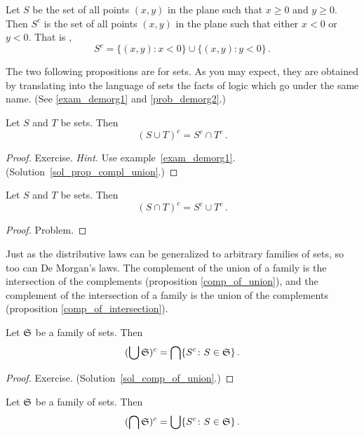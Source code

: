 \begin{exam} Let $S$ be the set of all points $(x,y)$ in the plane such that $x \ge 0$ and
$y \ge 0$.  Then $S^c$ is the set of all points $(x,y)$  in the plane such that either $x < 0$
or $y < 0$. That is ,
   \[ S^c  =  \{(x,y)\colon x < 0\} \cup \{(x,y)\colon y < 0\}\,. \]
\end{exam}

The two following propositions are
 for sets.  As you may expect, they are obtained by translating into the
language of sets the facts of logic which go under the same name. (See \ref{exam_demorg1} and
\ref{prob_demorg2}.)

\begin{prop}\label{prop_compl_union} Let $S$ and $T$ be sets.  Then
    \[ (S \cup T)^c = S^c \cap T^c\,. \]
\end{prop}

\begin{proof} Exercise.  \emph{Hint.}  Use example~\ref{exam_demorg1}.
(Solution~\ref{sol_prop_compl_union}.)   \ns
\end{proof}

\begin{prop} Let $S$ and $T$ be sets.  Then
   \[ (S \cap T)^c = S^c \cup T^c\,. \]
\end{prop}

\begin{proof} Problem. \ns \end{proof}

Just as the distributive laws can be generalized to arbitrary families of sets, so too can De
Morgan's laws.  The complement of the union of a family is the intersection of the complements
(proposition \ref{comp_of_union}), and the complement of the intersection of a family is the
union of the complements (proposition \ref{comp_of_intersection}).

\begin{prop}\label{comp_of_union} Let $\mathfrak{S}$ be a family of sets. Then
   \[ (\bigcup \mathfrak{S})^c = \bigcap\{S^c\colon S \in \mathfrak{S}\}\,. \]
\end{prop}

\begin{proof}  Exercise. (Solution~\ref{sol_comp_of_union}.) \ns \end{proof}

\begin{prop}\label{comp_of_intersection} Let $\mathfrak{S}$ be a family of sets.  Then
   \[ (\bigcap \mathfrak{S})^c  = \bigcup\{S^c\colon S \in \mathfrak{S}\}\,. \]
\end{prop}

